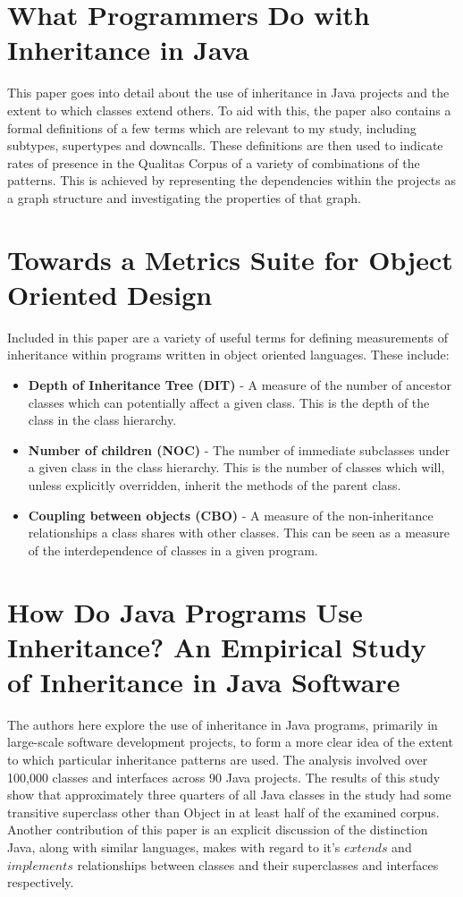 \section{What Programmers Do with Inheritance in Java~\cite{InheritanceInJava}}
This paper goes into detail about the use of inheritance in Java projects and the extent to which classes extend others. To aid with this, the paper also contains a formal definitions of a few terms which are relevant to my study, including subtypes, supertypes and downcalls. These definitions are then used to indicate rates of presence in the Qualitas Corpus of a variety of combinations of the patterns. This is achieved by representing the dependencies within the projects as a graph structure and investigating the properties of that graph.

\section{Towards a Metrics Suite for Object Oriented Design~\cite{MetricsSuite}}
Included in this paper are a variety of useful terms for defining measurements of inheritance within programs written in object oriented languages. These include:
\begin{itemize}
	\item \textbf{Depth of Inheritance Tree (DIT)} - A measure of the number of ancestor classes which can potentially affect a given class. This is the depth of the class in the class hierarchy.
	\item \textbf{Number of children (NOC)} - The number of immediate subclasses under a given class in the class hierarchy. This is the number of classes which will, unless explicitly overridden, inherit the methods of the parent class.
	\item \textbf{Coupling between objects (CBO)} - A measure of the non-inheritance relationships a class shares with other classes. This can be seen as a measure of the interdependence of classes in a given program.
\end{itemize}

\section{How Do Java Programs Use Inheritance? An Empirical Study of Inheritance in Java Software~\cite{HowProgramsUseInheritance}}
The authors here explore the use of inheritance in Java programs, primarily in large-scale software development projects, to form a more clear idea of the extent to which particular inheritance patterns are used. The analysis involved over 100,000 classes and interfaces across 90 Java projects. The results of this study show that approximately three quarters of all Java classes in the study had some transitive superclass other than Object in at least half of the examined corpus. \newline
Another contribution of this paper is an explicit discussion of the distinction Java, along with similar languages, makes with regard to it's $extends$ and $implements$ relationships between classes and their superclasses and interfaces respectively. 

